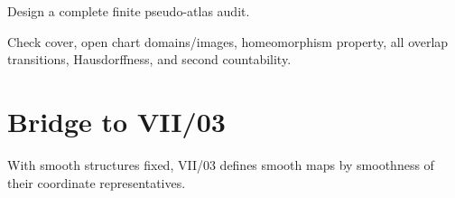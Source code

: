 \begin{problem}[Challenge]\label{chal:vii02-05}
Design a complete finite pseudo-atlas audit.
\end{problem}
\begin{solution}
Check cover, open chart domains/images, homeomorphism property, all overlap transitions, Hausdorffness, and second countability.
\end{solution}

\section*{Bridge to VII/03}
With smooth structures fixed, VII/03 defines smooth maps by smoothness of their coordinate representatives.
